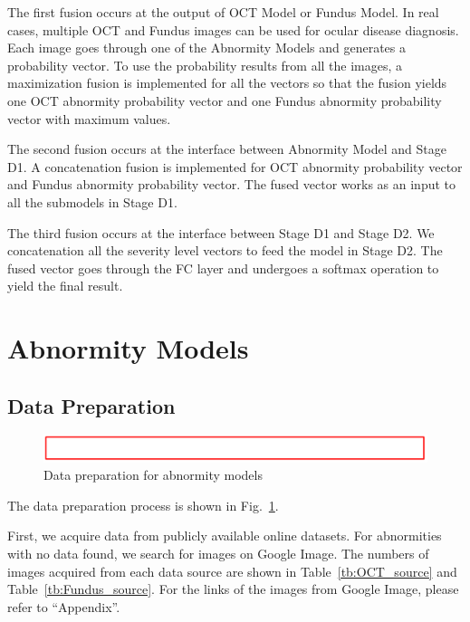 \documentclass{article}
\begin{document}
	The first fusion occurs at the output of OCT Model or Fundus Model. In real cases, multiple OCT and Fundus images can be used for ocular disease diagnosis. Each image goes through one of the Abnormity Models and generates a probability vector. To use the probability results from all the images, a maximization fusion is implemented for all the vectors so that the fusion yields one OCT abnormity probability vector and one Fundus abnormity probability vector with maximum values.
	
	The second fusion occurs at the interface between Abnormity Model and Stage D1. A concatenation fusion is implemented for OCT abnormity probability vector and Fundus abnormity probability vector. The fused vector works as an input to all the submodels in Stage D1.
	
	The third fusion occurs at the interface between Stage D1 and Stage D2. We concatenation all the severity level vectors to feed the model in Stage D2. The fused vector goes through the FC layer and undergoes a softmax operation to yield the final result.
	
	\section{Abnormity Models}
	
	\subsection{Data Preparation}
	
	\begin{figure}[htbp]
		\centering
		\includegraphics[width=\linewidth]{Figs/Temp.png}
		\caption{Data preparation for abnormity models}
		\vspace{0.3cm}
		\label{fig:A_data_prep}
	\end{figure}
	
	The data preparation process is shown in Fig.~\ref{fig:A_data_prep}. 
	
	First, we acquire data from publicly available online datasets. For abnormities with no data found, we search for images on Google Image. The numbers of images acquired from each data source are shown in Table~\ref{tb:OCT_source} and Table~\ref{tb:Fundus_source}. For the links of the images from Google Image, please refer to ``Appendix''. 
	
\end{document}
